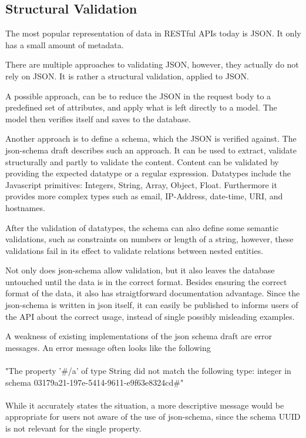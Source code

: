 \subsection{Structural Validation}

The most popular representation of data in RESTful APIs today is JSON. It only
has a small amount of metadata.

There are multiple approaches to validating JSON, however, they actually do not
rely on JSON. It is rather a structural validation, applied to JSON.

A possible approach, can be to reduce the JSON in the request body to a
predefined set of attributes, and apply what is left directly to a model. The
model then verifies itself and saves to the database.

Another approach is to define a schema, which the JSON is verified against. The
json-schema draft describes such an approach. It can be used to extract,
validate structurally and partly to validate the content. Content can be
validated by providing the expected datatype or a regular expression. Datatypes
include the Javascript primitives: Integers, String, Array, Object, Float.
Furthermore it provides more complex types such as email, IP-Address,
date-time, URI, and hostnames.

After the validation of datatypes, the schema can also define some semantic
validations, such as constraints on numbers or length of a string, however,
these validations fail in its effect to validate relations between nested
entities.

Not only does json-schema allow validation, but it also leaves the database
untouched until the data is in the correct format. Besides ensuring the correct
format of the data, it also has straigtforward documentation advantage. Since
the json-schema is written in json itself, it can easily be published to
informs users of the API about the correct usage, instead of single possibly
misleading examples.

A weakness of existing implementations of the json schema draft are error
messages. An error message often looks like the following

\paragraph{}{"The property '\#/a' of type String did not match the following type: integer in
schema 03179a21-197e-5414-9611-e9f63e8324cd\#"}

\paragraph{}{While it accurately states the situation, a more descriptive message would be
appropriate for users not aware of the use of json-schema, since the schema
UUID is not relevant for the single property.}

